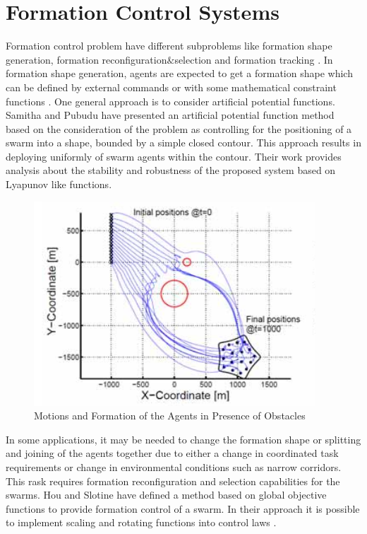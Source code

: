 \section{Formation Control Systems}
Formation control problem have different subproblems like formation shape generation, formation reconfiguration$\&$selection and formation tracking \cite{12}.  
In formation shape generation, agents are expected to get a formation shape which can be defined by external commands or with some mathematical constraint functions \cite{16}.  One general approach is to consider artificial potential functions. Samitha and Pubudu \cite{17} have presented an artificial potential function method  based on the consideration of the problem as controlling for the positioning of a swarm into a shape, bounded by a simple closed contour. This approach results in deploying uniformly of swarm agents within the contour.  Their work provides analysis about the stability and robustness of the proposed system based on Lyapunov like functions.

\begin{figure}[H]
	\caption{Motions and Formation of the Agents in Presence of Obstacles \cite{17}}
	\centering
	\includegraphics[scale = 0.7]{samitha}
\end{figure} 

In some applications, it may be needed to change the formation shape or splitting and joining of the agents together due to either a change in coordinated task requirements or change in environmental conditions such as narrow corridors.  This rask requires formation reconfiguration and selection capabilities for the swarms. Hou and Slotine have defined a method based on global objective functions to provide formation control of a swarm. In their approach it is possible to implement scaling and rotating functions into control laws \cite{8}.

